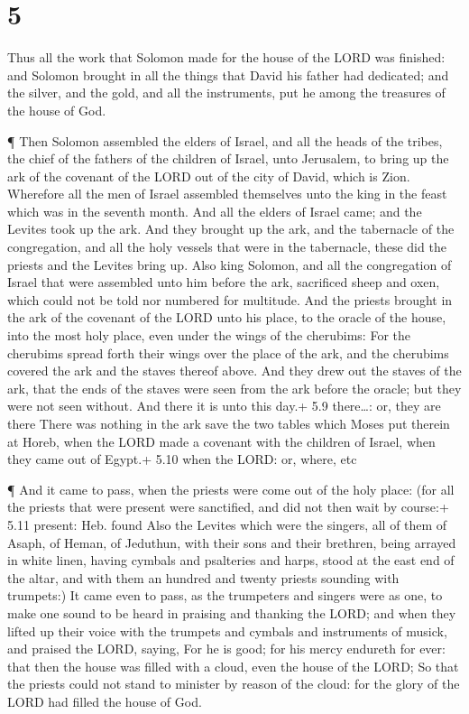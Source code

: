 \hypertarget{section-4}{%
\section{5}\label{section-4}}

 Thus all the work that Solomon made for the house of the
LORD was finished: and Solomon brought in all the things that David his
father had dedicated; and the silver, and the gold, and all the
instruments, put he among the treasures of the house of God.

 ¶ Then Solomon assembled the elders of Israel, and all the
heads of the tribes, the chief of the fathers of the children of Israel,
unto Jerusalem, to bring up the ark of the covenant of the LORD out of
the city of David, which is Zion.  Wherefore all the men of
Israel assembled themselves unto the king in the feast which was in the
seventh month.  And all the elders of Israel came; and the
Levites took up the ark.  And they brought up the ark, and
the tabernacle of the congregation, and all the holy vessels that were
in the tabernacle, these did the priests and the Levites bring up.
 Also king Solomon, and all the congregation of Israel that
were assembled unto him before the ark, sacrificed sheep and oxen, which
could not be told nor numbered for multitude.  And the
priests brought in the ark of the covenant of the LORD unto his place,
to the oracle of the house, into the most holy place, even under the
wings of the cherubims:  For the cherubims spread forth
their wings over the place of the ark, and the cherubims covered the ark
and the staves thereof above.  And they drew out the staves
of the ark, that the ends of the staves were seen from the ark before
the oracle; but they were not seen without. And there it is unto this
day.+ 5.9 there\ldots: or, they are there  There was
nothing in the ark save the two tables which Moses put therein at Horeb,
when the LORD made a covenant with the children of Israel, when they
came out of Egypt.+ 5.10 when the LORD: or, where, etc

 ¶ And it came to pass, when the priests were come out of
the holy place: (for all the priests that were present were sanctified,
and did not then wait by course:+ 5.11 present: Heb. found 
Also the Levites which were the singers, all of them of Asaph, of Heman,
of Jeduthun, with their sons and their brethren, being arrayed in white
linen, having cymbals and psalteries and harps, stood at the east end of
the altar, and with them an hundred and twenty priests sounding with
trumpets:)  It came even to pass, as the trumpeters and
singers were as one, to make one sound to be heard in praising and
thanking the LORD; and when they lifted up their voice with the trumpets
and cymbals and instruments of musick, and praised the LORD, saying, For
he is good; for his mercy endureth for ever: that then the house was
filled with a cloud, even the house of the LORD;  So that
the priests could not stand to minister by reason of the cloud: for the
glory of the LORD had filled the house of God.

